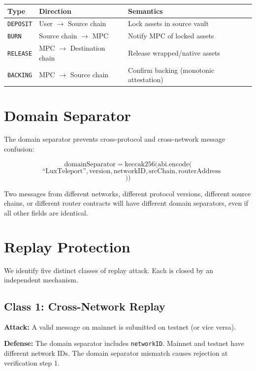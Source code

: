 \documentclass[11pt,a4paper]{article}
\begin{document}
\begin{center}
\begin{tabular}{lll}
\toprule
\textbf{Type} & \textbf{Direction} & \textbf{Semantics} \\
\midrule
\texttt{DEPOSIT} & User $\to$ Source chain & Lock assets in source vault \\
\texttt{BURN} & Source chain $\to$ MPC & Notify MPC of locked assets \\
\texttt{RELEASE} & MPC $\to$ Destination chain & Release wrapped/native assets \\
\texttt{BACKING} & MPC $\to$ Source chain & Confirm backing (monotonic attestation) \\
\bottomrule
\end{tabular}
\end{center}

\section{Domain Separator}\label{sec:domain}

The domain separator prevents cross-protocol and cross-network message confusion:

$$\text{domainSeparator} = \text{keccak256}(\text{abi.encode}($$
$$\quad \text{``LuxTeleport''}, \text{version}, \text{networkID}, \text{srcChain}, \text{routerAddress}$$
$$))$$

Two messages from different networks, different protocol versions, different source chains, or different router contracts will have different domain separators, even if all other fields are identical.

\section{Replay Protection}

We identify five distinct classes of replay attack. Each is closed by an independent mechanism.

\subsection{Class 1: Cross-Network Replay}

\textbf{Attack:} A valid message on mainnet is submitted on testnet (or vice versa).

\textbf{Defense:} The domain separator includes \texttt{networkID}. Mainnet and testnet have different network IDs. The domain separator mismatch causes rejection at verification step 1.
\end{document}
